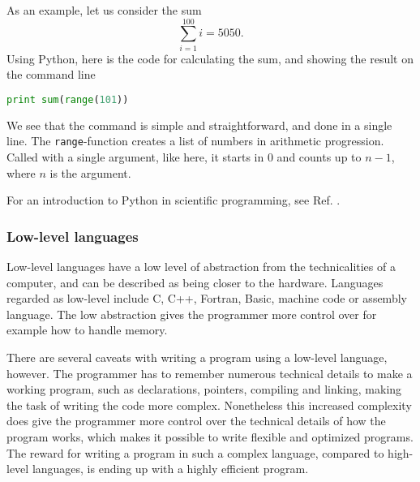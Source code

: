 		As an example, let us consider the sum
		\begin{equation} \label{eq:simple_sum}
			\sum_{i=1}^{100} i=5050.
		\end{equation}
		Using Python, here is the code for calculating the sum, and showing the result on the command line
\begin{lstlisting}[language=Python, firstnumber=1, framesep=0pt]
print sum(range(101))
\end{lstlisting}
		We see that the command is simple and straightforward, and done in a single line. The {\tt range}-function creates a list of numbers in arithmetic progression. Called with a single argument, like here, it starts in $0$ and counts up to $n-1$, where $n$ is the argument. 

		For an introduction to Python in scientific programming, see Ref. \cite{langtangen2011primer}.

	\subsubsection{Low-level languages}
		Low-level languages have a low level of abstraction from the technicalities of a computer, and can be described as being closer to the hardware. Languages regarded as low-level include C, C++, Fortran, Basic, machine code or assembly language. The low abstraction gives the programmer more control over for example how to handle memory.

		There are several caveats with writing a program using
                a low-level language, however. The programmer has to
                remember numerous technical details to make a working
                program, such as declarations, pointers, compiling and
                linking, making the task of writing the code more
                complex. Nonetheless this increased complexity does
                give the programmer more control over the technical
                details of how the program works, which makes it
                possible to write flexible and optimized programs. The
                reward for writing a program in such a complex
                language, compared to high-level languages, is ending
                up with a highly efficient program.

